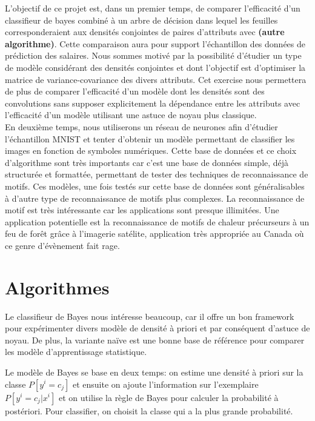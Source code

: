 \documentclass[12pt,letterpaper]{article}
\begin{document}
L'objectif de ce projet est, dans un premier temps, de comparer l'efficacité
d'un classifieur de bayes combiné à un arbre de décision dans lequel les
feuilles corresponderaient aux densités conjointes de paires d'attributs avec
\textbf{(autre algorithme)}. Cette comparaison aura pour support l'échantillon des
données de prédiction des salaires. Nous sommes motivé par la possibilité d'étudier 
un type de modèle considérant des densités conjointes et dont l'objectif est 
d'optimiser la matrice de variance-covariance des divers attributs. Cet exercise 
nous permettera de plus de comparer l'efficacité d'un modèle dont les densités 
sont des convolutions sans supposer explicitement la dépendance entre les 
attributs avec l'efficacité d'un modèle utilisant une astuce de noyau plus classique. \\

En deuxième temps, nous utiliserons un réseau de neurones afin d'étudier 
l'échantillon MNIST et tenter d'obtenir un modèle permettant de classifier les 
images en fonction de symboles numériques. Cette base de données et ce choix 
d'algorithme sont très importants car c'est une base de données simple, déjà 
structurée et formattée, permettant de tester des techniques de reconnaissance 
de motifs. Ces modèles, une fois testés sur cette base de données sont 
généralisables à d'autre type de reconnaissance de motifs plus complexes. 
La reconnaissance de motif est très intéressante car les 
applications sont presque illimitées. Une application potentielle est la 
reconnaissance de motifs de chaleur précurseurs à un feu de forêt grâce à 
l'imagerie satélite, application très appropriée au Canada où ce genre 
d'évènement fait rage. \\


\section{Algorithmes}

Le classifieur de Bayes nous intéresse beaucoup, car il offre un bon framework
pour expérimenter divers modèle de densité à priori et par conséquent d'astuce
de noyau. De plus, la variante naïve est une bonne base de référence pour
comparer les modèle d'apprentissage statistique.

Le modèle de Bayes se base en deux temps: on estime une densité à priori sur la
classe $P[y^i = c_j]$ et ensuite on ajoute l'information sur l'exemplaire
$P[y^i = c_j | x^i]$ et on utilise la règle de Bayes pour calculer la
probabilité à postériori. Pour classifier, on choisit la classe qui a la plus
grande probabilité.
\end{document}
